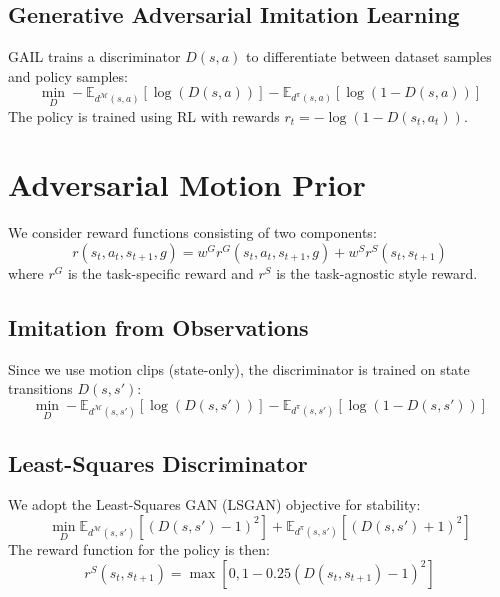 \documentclass[acmtog]{acmart}
\begin{document}
\subsection{Generative Adversarial Imitation Learning}
GAIL trains a discriminator $D(s, a)$ to differentiate between dataset samples and policy samples:
\begin{equation}
    \min_{D} -\mathbb{E}_{d^{\mathcal{M}}(s,a)} [\log(D(s,a))] - \mathbb{E}_{d^{\pi}(s,a)} [\log(1 - D(s,a))]
\end{equation}
The policy is trained using RL with rewards $r_t = -\log(1 - D(s_t, a_t))$.

\section{Adversarial Motion Prior}
We consider reward functions consisting of two components:
\begin{equation}
    r(s_t, a_t, s_{t+1}, g) = w^G r^G(s_t, a_t, s_{t+1}, g) + w^S r^S(s_t, s_{t+1})
\end{equation}
where $r^G$ is the task-specific reward and $r^S$ is the task-agnostic style reward.

\subsection{Imitation from Observations}
Since we use motion clips (state-only), the discriminator is trained on state transitions $D(s, s')$:
\begin{equation}
    \min_{D} -\mathbb{E}_{d^{\mathcal{M}}(s,s')} [\log(D(s,s'))] - \mathbb{E}_{d^{\pi}(s,s')} [\log(1 - D(s,s'))]
\end{equation}

\subsection{Least-Squares Discriminator}
We adopt the Least-Squares GAN (LSGAN) objective for stability:
\begin{equation}
    \min_{D} \mathbb{E}_{d^{\mathcal{M}}(s,s')} [(D(s,s') - 1)^2] + \mathbb{E}_{d^{\pi}(s,s')} [(D(s,s') + 1)^2]
\end{equation}
The reward function for the policy is then:
\begin{equation}
    r^S(s_t, s_{t+1}) = \max [0, 1 - 0.25(D(s_t, s_{t+1}) - 1)^2]
\end{equation}
\end{document}
